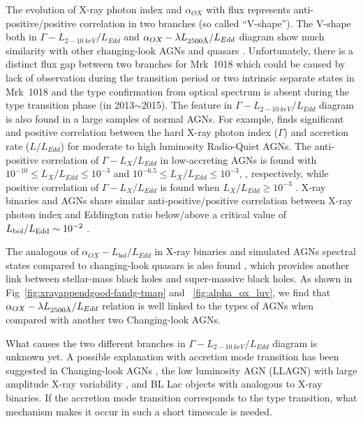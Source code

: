 \documentclass[twocolumn]{aastex63}
\newcommand{\angstrom}{\text{\normalfont\AA}}
\begin{document}
The evolution of X-ray photon index and $\alpha_{OX}$ with flux represents anti-positive/positive correlation in two branches (so called ``V-shape''). The V-shape both in $\Gamma-L_{2-10~keV}/L_{Edd}$ and $\alpha_{OX}-\lambda L_{2500\angstrom}/L_{Edd}$ diagram show much similarity with other changing-look AGNs \citep[see ][]{2019arXiv190904676R} and quasars \citep[see][]{2019ApJ...883...76R}. Unfortunately, there is a distinct flux gap between two branches for Mrk~1018 which could be caused by lack of observation during the transition period or two intrinsic separate states in Mrk~1018 and the type confirmation from optical spectrum is absent during the type transition phase (in 2013$\sim$2015). The feature in $\Gamma-L_{2-10~keV}/L_{Edd}$ diagram is also found in a large samples of normal AGNs. For example, \citet{2008ApJ...682...81S} finds significant and positive correlation between the hard X-ray photon index ($\Gamma$) and accretion rate ($L/L_{Edd}$) for moderate to high luminosity Radio-Quiet AGNs. The anti-positive correlation of $\Gamma-L_X/L_{Edd}$ in low-accreting AGNs is found with $10^{-10}\leq L_X/L_{Edd} \leq 10^{-3}$ and $10^{-6.5}\leq L_X/L_{Edd} \leq 10^{-3}$, \citep[see][]{2014MNRAS.443...72J,2015MNRAS.447.1692Y}, respectively, while positive correlation of $\Gamma-L_X/L_{Edd}$ is found when $L_X/L_{Edd} \geq 10^{-3}$ \citep[see][]{2015MNRAS.447.1692Y}. X-ray binaries and AGNs share similar anti-positive/positive correlation between X-ray photon index and Eddington ratio below/above a critical value of $L_{\rm bol}/L_{\rm Edd}\sim 10^{-2}$ \citep[e.g.,][and references therein]{2007ApJ...658..282Y,2008ApJ...682..212W,2009MNRAS.399..349G,2011A&A...530A.149Y,2015MNRAS.447.1692Y,2019arXiv191203971L,2019arXiv191212145Y}.

The analogous of $\alpha_{OX}-L_{bol}/L_{Edd}$ in X-ray binaries and simulated AGNs spectral states compared to changing-look quasars is also found \citep[see ][]{2011MNRAS.417..280S,2011MNRAS.413.2259S,2019ApJ...883...76R}, which provides another link between stellar-mass black holes and super-massive black holes. As shown in Fig~\ref{fig:xrayappendgood-fandg-tmap} and ~\ref{fig:alpha_ox_luv}, we find that $\alpha_{OX}-\lambda L_{2500\angstrom}/L_{Edd}$ relation is well linked to the types of AGNs when compared with another two Changing-look AGNs.   

What causes the two different branches in $\Gamma-L_{2-10~keV}/L_{Edd}$ diagram is unknown yet. A possible explanation with accretion mode transition has been suggested in Changing-look AGNs \citep[e.g.,][]{2019arXiv191200164A, 2019arXiv191203972L}, the low luminosity AGN (LLAGN) with large amplitude X-ray variability \citep[e.g.,][]{2019arXiv191201897L}, and BL Lac objects\citep[e.g.,][]{2003ApJ...599..147C} with analogous to X-ray binaries\citep[e.g.,][]{2005A&A...442L..15P,2018MNRAS.476.1581A}. If the accretion mode transition corresponds to the type transition, what mechanism makes it occur in such a short timescale is needed. 
\end{document}
